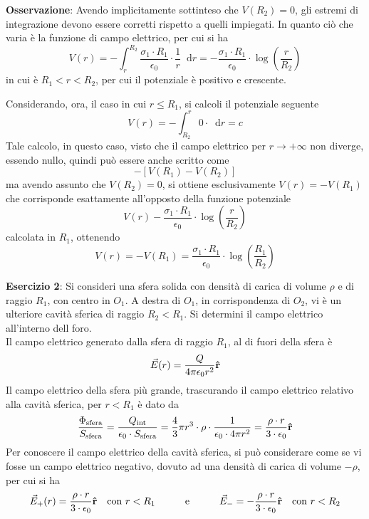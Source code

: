 \documentclass[a4paper]{extarticle}
\newcommand\dif{\mathop{}\!\mathrm{d}}
\begin{document}
\vspace{1em}
\noindent
\textbf{Osservazione}: Avendo implicitamente sottinteso che $V(R_2)=0$, gli estremi di integrazione devono essere corretti rispetto a quelli impiegati. In quanto ciò che varia è la funzione di campo elettrico, per cui si ha 
\[V(r) = -\int_{r}^{R_2} \frac{\sigma_1 \cdot R_1}{\epsilon_0} \cdot \frac{1}{r} \dif r = -\frac{\sigma_1 \cdot R_1}{\epsilon_0} \cdot \log \left(\frac{r}{R_2}\right)\]
in cui è $R_1 < r < R_2$, per cui il potenziale è positivo e crescente.

\vspace{1em}
\noindent
Considerando, ora, il caso in cui $r \leq R_1$, si calcoli il potenziale seguente
\[V(r) = -\int_{R_2}^r 0 \cdot \dif r = c\]
Tale calcolo, in questo caso, visto che il campo elettrico per $r \to +\infty$ non diverge, essendo nullo, quindi può essere anche scritto come
\[- \left[V(R_1)-V(R_2)\right]\]
ma avendo assunto che $V(R_2)=0$, si ottiene esclusivamente $V(r)=-V(R_1)$ che corrisponde esattamente all'opposto della funzione potenziale 
\[V(r)-\frac{\sigma_1 \cdot R_1}{\epsilon_0} \cdot \log \left(\frac{r}{R_2}\right)\]
calcolata in $R_1$, ottenendo
\[V(r)=-V(R_1)=\frac{\sigma_1 \cdot R_1}{\epsilon_0} \cdot \log \left(\frac{R_1}{R_2}\right)\]

\vspace{2em}
\noindent
\textbf{Esercizio 2}: Si consideri una sfera solida con densità di carica di volume $\rho$ e di raggio $R_1$, con centro in $O_1$. A destra di $O_1$, in corrispondenza di $O_2$, vi è un ulteriore cavità sferica di raggio $R_2<R_1$. Si determini il campo elettrico all'interno dell foro.\\
Il campo elettrico generato dalla sfera di raggio $R_1$, al di fuori della sfera è
\[\vec E(r) = \frac{Q}{4 \pi \epsilon_0 r^2} {\bf{\hat r}}\]
Il campo elettrico della sfera più grande, trascurando il campo elettrico relativo alla cavità sferica, per $r<R_1$ è dato da
\[\frac{\Phi_\text{sfera}}{S_\text{sfera}} = \frac{Q_{\text{int}}}{\epsilon_0 \cdot S_\text{sfera}} = \frac{4}{3} \pi r^3 \cdot \rho \cdot \frac{1}{\epsilon_0 \cdot 4 \pi r^2} = \frac{\rho \cdot r}{3 \cdot \epsilon_0} {\bf{\hat r}}\]
Per conoscere il campo elettrico della cavità sferica, si può considerare come se vi fosse un campo elettrico negativo, dovuto ad una densità di carica di volume $-\rho$, per cui si ha
\[\vec{E}_+(r) = \frac{\rho \cdot r}{3 \cdot \epsilon_0} {\bf{\hat r}} \hspace{1em} \text{con } r < R_1 \hspace{3em}  \text{e} \hspace{3em} \vec{E}_- = -\frac{\rho \cdot r}{3 \cdot \epsilon_0} {\bf{\hat r}} \hspace{1em} \text{con } r < R_2\]
\end{document}
